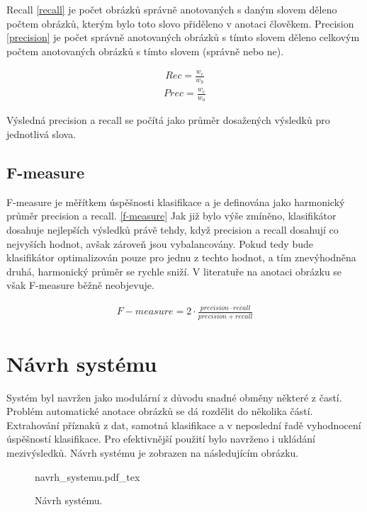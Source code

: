 \documentclass[czech,BP]{thesiskiv}
\begin{document}
\par Recall \eqref{recall} je počet obrázků správně anotovaných s daným slovem děleno počtem obrázků, kterým bylo toto slovo přiděleno v anotaci člověkem. Precision \eqref{precision} je počet správně anotovaných obrázků s tímto slovem děleno celkovým počtem anotovaných obrázků s tímto slovem (správně nebo ne). 

\begin{align}
   \label{recall} Rec = \frac{w_c}{w_h}
\end{align}
\begin{align}
   \label{precision} Prec = \frac{w_c}{w_a}
\end{align}

\par Výsledná precision a recall se počítá jako průměr dosažených výsledků pro jednotlivá slova. 

\section{F-measure}
F-measure je měřítkem úspěšnosti klasifikace a je definována jako harmonický průměr precision a recall. \eqref{f-measure} Jak již bylo výše zmíněno, klasifikátor dosahuje nejlepších výsledků právě tehdy, když precision a recall dosahují co nejvyších hodnot, avšak zároveň jsou vybalancovány. Pokud tedy bude klasifikátor optimalizován pouze pro jednu z techto hodnot, a tím znevýhodněna druhá, harmonický průměr se rychle sniží. V literatuře na anotaci obrázku se však F-measure běžně neobjevuje.

\begin{align}
   \label{f-measure} F-measure = 2 \cdot \frac{precision \cdot recall}{precision + recall}
\end{align}


\chapter{Návrh systému}
Systém byl navržen jako modulární z důvodu snadné obměny některé z častí. Problém automatické anotace obrázků se dá rozdělit do několika částí. Extrahování příznaků z dat, samotná klasifikace a v neposlední řadě vyhodnocení úspěšností klasifikace. Pro efektivnější použití bylo navrženo i ukládání mezivýsledků. Návrh systému je zobrazen na následujícím obrázku.


\begin{figure}[ht]
    \centering
    \label{navrh_systemu}
    \def\svgwidth{\columnwidth}
    {navrh_systemu.pdf_tex} 
    \caption{Návrh systému.}
\end{figure}
\end{document}
